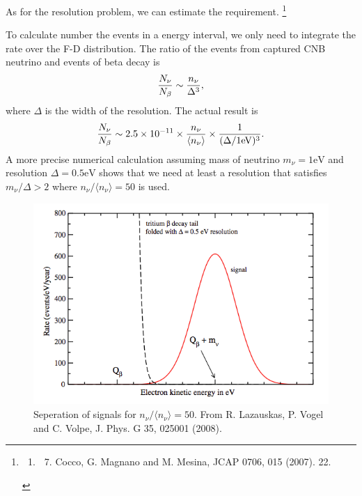 \documentclass[letterpaper,12pt,english]{sphinxmanual}
\begin{document}
As for the resolution problem, we can estimate the requirement. \footnote{\begin{enumerate}
\item {} \begin{enumerate}
\setcounter{enumi}{6}
\item {} 
Cocco, G. Magnano and M. Mesina, JCAP 0706, 015 (2007). 22.

\end{enumerate}

\end{enumerate}
}

To calculate number the events in a energy interval, we only need to integrate the rate over the F-D distribution. The ratio of the events from captured CNB neutrino and events of beta decay is
\begin{gather}
\begin{split}\frac{N_\nu}{N_\beta} \sim \frac{n_\nu}{\Delta^3},\end{split}\notag
\end{gather}
where \(\Delta\) is the width of the resolution. The actual result is \footnotemark[1]
\begin{gather}
\begin{split}\frac{N_\nu}{N_\beta} \sim 2.5\times 10^{-11} \times \frac{n_\nu}{\langle n_\nu \rangle} \times \frac{1}{ (\Delta/1\mathrm{eV})^3 }.\end{split}\notag
\end{gather}
A more precise numerical calculation assuming mass of neutrino \(m_\nu=1\mathrm{eV}\) and resolution \(\Delta = 0.5\mathrm{eV}\) shows that we need at least a resolution that satisfies \(m_\nu/\Delta > 2\) where \(n_\nu/\langle n_\nu \rangle = 50\) is used. \footnotemark[9]
\begin{figure}[htbp]
\centering
\capstart

\includegraphics{energyResolutionAndSignal.png}
\caption{Seperation of signals for \(n_\nu/\langle n_\nu \rangle = 50\). From R. Lazauskas, P. Vogel and C. Volpe, J. Phys. G 35, 025001 (2008).}\end{figure}
\end{document}
